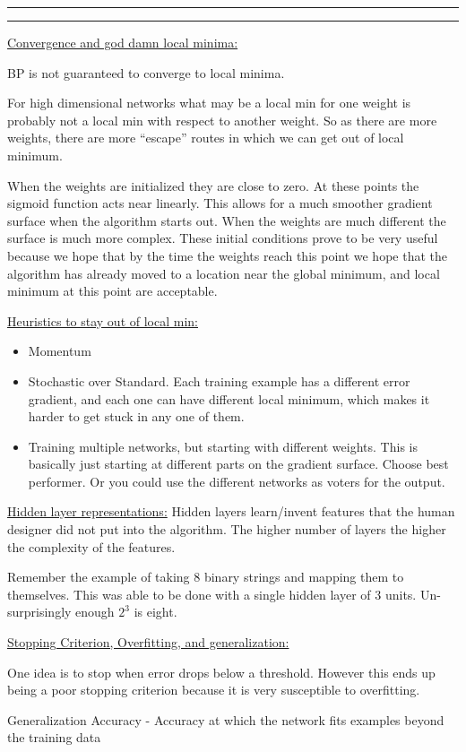 \documentclass[11pt]{article}
\newcounter{questionCounter}
\newcounter{partCounter}[questionCounter]
\newenvironment{question}[2][\arabic{questionCounter}]{%
    \addtocounter{questionCounter}{1}%
    \setcounter{partCounter}{0}%
    \vspace{.25in} \hrule \vspace{0.5em}%
        \noindent{\bf #1: #2}%
    \vspace{0.8em} \hrule \vspace{.10in}%
}{}
\begin{document}
\begin{question}{Artificial Neural Networks: }
\underline{Convergence and god damn local minima:}

BP is not guaranteed to converge to local minima.

For high dimensional networks what may be a local min for one weight is probably not a local
min with respect to another weight. So as there are more weights, there are more ``escape'' routes
in which we can get out of local minimum. 

When the weights are initialized they are close to zero. At these points the sigmoid function
acts near linearly. This allows for a much smoother gradient surface when the algorithm starts out. 
When the weights are much different the surface is much more complex. These initial conditions
prove to be very useful because we hope that by the time the weights reach this point we hope
that the algorithm has already moved to a location near the global minimum, and local minimum
at this point are acceptable.

\underline{Heuristics to stay out of local min:}
\begin{itemize}
    \item Momentum
    \item Stochastic over Standard. Each training example has a different error gradient, and each one
    can have different local minimum, which makes it harder to get stuck in any one of them.
    \item Training multiple networks, but starting with different weights. This is basically just
    starting at different parts on the gradient surface. Choose best performer. Or you could use
    the different networks as voters for the output.
\end{itemize}


\underline{Hidden layer representations:}
Hidden layers learn/invent features that the human designer did not put into the algorithm. The higher
number of layers the higher the complexity of the features.

Remember the example of taking 8 binary strings and mapping them to themselves. This was able to be done
with a single hidden layer of 3 units. Un-surprisingly enough $2^3$ is eight.

\underline{Stopping Criterion, Overfitting, and generalization:}

One idea is to stop when error drops below a threshold. However this ends up being a poor stopping criterion
because it is very susceptible to overfitting.

Generalization Accuracy - Accuracy at which the network fits examples beyond the training data


\end{question}
\end{document}

